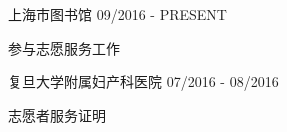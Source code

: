 
\begin{cventries}

\cvexperience
{上海市图书馆}
{09/2016 - PRESENT}
{
    \begin{cvitems}
    \item {参与志愿服务工作}
    \end{cvitems}
}

\cvexperience
{复旦大学附属妇产科医院}
{07/2016 - 08/2016}
{
    \begin{cvitems}
    \item {志愿者服务证明}
    \end{cvitems}
}

\end{cventries}